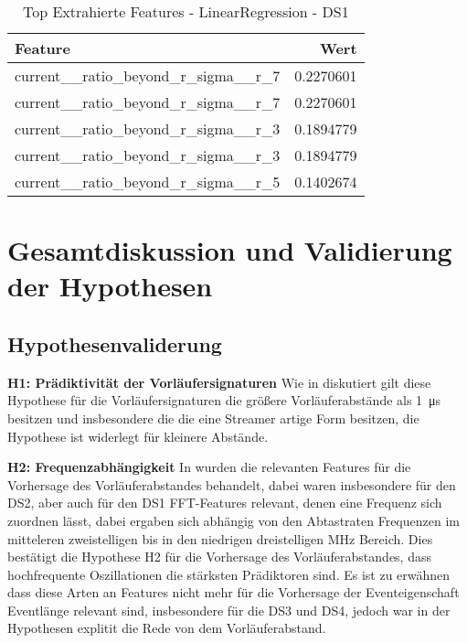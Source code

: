 \begin{table}[h!]
\centering
\caption{Top Extrahierte Features - LinearRegression - DS1}
\label{tab:ds1-features-ana}
\begin{tabular}{l r}
\hline
\textbf{Feature} & \textbf{Wert} \\
\hline
current\_\_ratio\_beyond\_r\_sigma\_\_r\_7 & 0.2270601 \\
current\_\_ratio\_beyond\_r\_sigma\_\_r\_7 & 0.2270601 \\
current\_\_ratio\_beyond\_r\_sigma\_\_r\_3 & 0.1894779 \\
current\_\_ratio\_beyond\_r\_sigma\_\_r\_3 & 0.1894779 \\
current\_\_ratio\_beyond\_r\_sigma\_\_r\_5 & 0.1402674 \\
\hline
\end{tabular}
\end{table}

\section{Gesamtdiskussion und Validierung der Hypothesen}

\subsection{Hypothesenvaliderung}


\textbf{H1: Prädiktivität der Vorläufersignaturen}\newline
Wie in  diskutiert gilt diese Hypothese für die Vorläufersignaturen die größere Vorläuferabstände als \SI{1}{\micro\second} besitzen und insbesondere die die eine Streamer artige Form besitzen, die Hypothese ist widerlegt für kleinere Abstände.


\textbf{H2: Frequenzabhängigkeit}\newline
In  wurden die relevanten Features für die Vorhersage des Vorläuferabstandes behandelt, dabei waren insbesondere für den DS2, aber auch für den DS1 FFT-Features relevant, denen eine Frequenz sich zuordnen lässt, dabei ergaben sich abhängig von den Abtastraten Frequenzen im mitteleren zweistelligen bis in den niedrigen dreistelligen MHz Bereich. Dies bestätigt die Hypothese H2 für die Vorhersage des Vorläuferabstandes, dass hochfrequente Oszillationen die stärksten Prädiktoren sind. Es ist zu erwähnen dass diese Arten an Features nicht mehr für die Vorhersage der Eventeigenschaft Eventlänge relevant sind, insbesondere für die DS3 und DS4, jedoch war in der Hypothesen explitit die Rede von dem Vorläuferabstand. 


